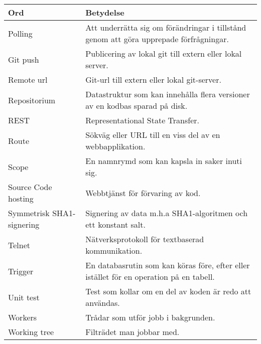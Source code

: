 \begin{tabular} { | l | p{10cm} | }
\hline
\bf{Ord} & \bf{Betydelse} \\
\hline
Polling & Att underrätta sig om förändringar i tillstånd genom att göra upprepade förfrågningar. \\
\hline
Git push & Publicering av lokal git till extern eller lokal server. \\
\hline
Remote url & Git-url till extern eller lokal git-server. \\
\hline
Repositorium & Datastruktur som kan innehålla flera versioner av en kodbas sparad på disk. \\
\hline
REST & Representational State Transfer. \\
\hline
Route & Sökväg eller URL till en viss del av en webbapplikation. \\
\hline
Scope & En namnrymd som kan kapsla in saker inuti sig. \\
\hline
Source Code hosting & Webbtjänst för förvaring av kod. \\
\hline
Symmetrisk SHA1-signering & Signering av data m.h.a SHA1-algoritmen och ett konstant salt. \\
\hline
Telnet & Nätverksprotokoll för textbaserad kommunikation. \\
\hline
Trigger & En databasrutin som kan köras före, efter eller istället för en operation på en tabell. \\
\hline
Unit test & Test som kollar om en del av koden är redo att användas. \\
\hline
Workers & Trådar som utför jobb i bakgrunden. \\
\hline
Working tree & Filträdet man jobbar med. \\
\hline
\end{tabular}
\normalsize

